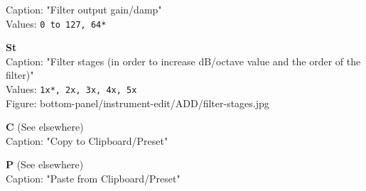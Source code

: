 \documentclass[
 11pt,
 twoside,
 a4paper,
 headinclude,
 footinclude,
 final                                 %
]{article}
\begin{document}
\begin{enumber}
\begin{enumber}
\begin{enumber}
\begin{enumber}
\begin{enumber}
                  Caption: "Filter output gain/damp" \\
                  Values: \texttt{0 to 127, 64*}
               \item \textbf{St} \\
                  Caption: "Filter stages (in order to increase dB/octave value and
                     the order of the filter)" \\
                  Values: \texttt{1x*, 2x, 3x, 4x, 5x} \\
                  Figure: bottom-panel/instrument-edit/ADD/filter-stages.jpg
               \item \textbf{C} (See elsewhere)\\
                  Caption: "Copy to Clipboard/Preset"
               \item \textbf{P} (See elsewhere)\\
                  Caption: "Paste from Clipboard/Preset"
            \end{enumber}



\end{enumber}
\end{enumber}
\end{enumber}
\end{enumber}
\end{document}
